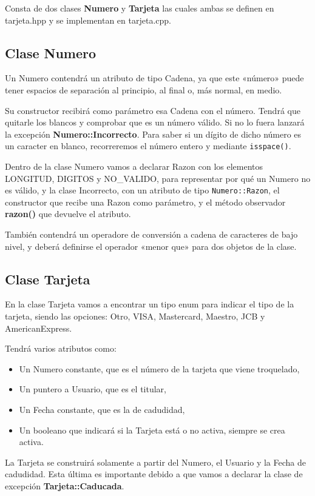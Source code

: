 Consta de dos clases \textbf{Numero} y \textbf{Tarjeta} las cuales ambas se definen en tarjeta.hpp y se implementan en tarjeta.cpp.

\subsection{Clase Numero}
Un Numero contendrá un atributo de tipo Cadena, ya que este «número» puede tener espacios de separación al principio, al final o, más normal, en medio.

Su constructor recibirá como parámetro esa Cadena con el número. Tendrá que quitarle los blancos y comprobar que es un número válido. Si no lo fuera lanzará la excepción \textbf{Numero::Incorrecto}.
Para saber si un dígito de dicho número es un caracter en blanco, recorreremos el número entero y mediante \texttt{isspace()}.

Dentro de la clase Numero vamos a declarar Razon con los elementos LONGITUD, DIGITOS y NO\_VALIDO, para representar por qué un Numero no es válido, y la clase Incorrecto, con un atributo de tipo \texttt{Numero::Razon}, el constructor que recibe una Razon como parámetro, y el método observador \textbf{razon()} que devuelve el atributo.

También contendrá un operadore de conversión a cadena de caracteres de bajo nivel, y deberá definirse el operador «menor que» para dos objetos de la clase.
\newpage
\subsection{Clase Tarjeta}
En la clase Tarjeta vamos a encontrar un tipo enum para indicar el tipo de la tarjeta, siendo las opciones: Otro, VISA, Mastercard, Maestro, JCB y AmericanExpress.

Tendrá varios atributos como:

\begin{itemize}
    \item Un Numero constante, que es el número de la tarjeta que viene troquelado,
    \item Un puntero a Usuario, que es el titular,
    \item Un Fecha constante, que es la de cadudidad,
    \item Un booleano que indicará si la Tarjeta está o no activa, siempre se crea activa.
\end{itemize}

La Tarjeta se construirá solamente a partir del Numero, el Usuario y la Fecha de cadudidad. Esta última es importante debido a que vamos a declarar la clase de excepción \textbf{Tarjeta::Caducada}.


